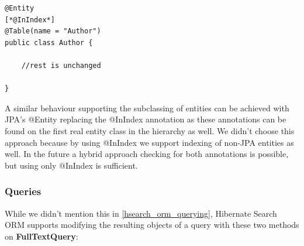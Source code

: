 \lstset{language=java}
\begin{lstlisting}[frame=htrbl, caption={Author.java with @InIndex}, label={lst:author.java_2}]
@Entity
[*@InIndex*]
@Table(name = "Author")
public class Author {
	
	//rest is unchanged
	
}
\end{lstlisting}
\noindent
A similar behaviour supporting the subclassing of entities can be achieved with JPA's @Entity  replacing the @InIndex annotation as these annotations can be found on the first real entity class in the hierarchy as well. We didn't choose this approach because by using @InIndex we support indexing of non-JPA entities as well. In the future a hybrid approach checking for both annotations is possible, but using only @InIndex is sufficient.

\pagebreak

\subsubsection{Queries}
While we didn't mention this in \ref{hsearch_orm_querying}, Hibernate Search ORM supports modifying the resulting objects of a query with these two methods on \textbf{FullTextQuery}:

